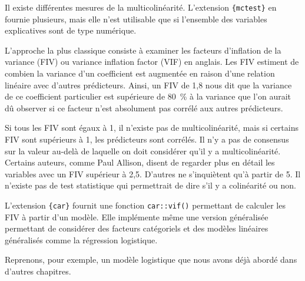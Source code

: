 \documentclass[
  letterpaper,
  DIV=11,
  numbers=noendperiod,
  oneside]{scrreprt}
\begin{document}
Il existe différentes mesures de la multicolinéarité. L'extension
\texttt{\{mctest\}} en fournie plusieurs, mais elle n'est utilisable que
si l'ensemble des variables explicatives sont de type numérique.

L'approche la plus classique consiste à examiner les facteurs
d'inflation de la variance (FIV) ou variance inflation factor (VIF) en
anglais. Les FIV estiment de combien la variance d'un coefficient est
augmentée en raison d'une relation linéaire avec d'autres prédicteurs.
Ainsi, un FIV de 1,8 nous dit que la variance de ce coefficient
particulier est supérieure de 80~\% à la variance que l'on aurait dû
observer si ce facteur n'est absolument pas corrélé aux autres
prédicteurs.

Si tous les FIV sont égaux à 1, il n'existe pas de multicolinéarité,
mais si certains FIV sont supérieurs à 1, les prédicteurs sont corrélés.
Il n'y a pas de consensus sur la valeur au-delà de laquelle on doit
considérer qu'il y a multicolinéarité. Certains auteurs, comme Paul
Allison, disent de regarder plus en
détail les variables avec un FIV supérieur à 2,5. D'autres ne
s'inquiètent qu'à partir de 5. Il n'existe pas de test statistique qui
permettrait de dire s'il y a colinéarité ou non.

L'extension \texttt{\{car\}} fournit une fonction \texttt{car::vif()}
permettant de calculer les FIV à partir d'un modèle. Elle implémente
même une version généralisée permettant de considérer des facteurs
catégoriels et des modèles linéaires généralisés comme la régression
logistique.

Reprenons, pour exemple, un modèle logistique que nous avons déjà abordé
dans d'autres chapitres.
\end{document}
